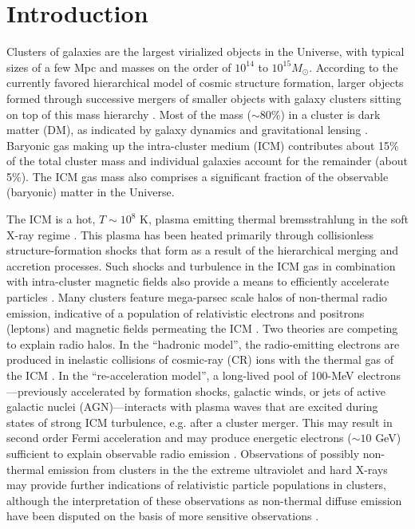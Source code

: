 \documentclass[12pt,manuscript]{aastex}
\begin{document}
%
%

\section{Introduction}
Clusters of galaxies are the largest virialized objects in the Universe, with typical sizes of a
few Mpc and masses on the order of $10^{14}$ to $10^{15} M_{\odot}$. According to the currently
favored hierarchical model of cosmic structure formation, larger objects formed through successive
mergers of smaller objects with galaxy clusters sitting on top of this mass hierarchy
\citep[see][for a review]{article:Voit:2005}. Most of the mass ($\sim$80\%) in a cluster is dark
matter (DM), as indicated by galaxy dynamics and gravitational lensing
\citep{article:DiaferioSchindlerDolag:2008}. Baryonic gas making up the intra-cluster medium (ICM)
contributes about 15\% of the total cluster mass and individual galaxies account for the remainder
(about 5\%). The ICM gas mass also comprises a significant fraction of the observable (baryonic)
matter in the Universe.

The ICM is a hot, $T\sim 10^{8}$ K, plasma emitting thermal bremsstrahlung in the soft X-ray regime
\citep[see, e.g.,][]{article:Petrosian:2001}. This plasma has been heated primarily through
collisionless structure-formation shocks that form as a result of the hierarchical merging and
accretion processes. Such shocks and turbulence in the ICM gas in combination with intra-cluster
magnetic fields also provide a means to efficiently accelerate particles \citep[see,
e.g.,][]{article:ColafrancescoBlasi:1998, article:Ryu_etal:2003}. Many clusters feature mega-parsec
scale halos of non-thermal radio emission, indicative of a population of relativistic electrons and
positrons (leptons) and magnetic fields permeating the ICM \citep{article:Cassano_etal:2010}. Two
theories are competing to explain radio halos. In the ``hadronic model'', the radio-emitting
electrons are produced in inelastic collisions of cosmic-ray (CR) ions with the thermal gas of the
ICM \citep{article:Dennison:1980, article:EnsslinPfrommerMiniatiSubramanian:2011}. In the
``re-acceleration model'', a long-lived pool of 100-MeV electrons---previously accelerated by
formation shocks, galactic winds, or jets of active galactic nuclei (AGN)---interacts with plasma
waves that are excited during states of strong ICM turbulence, e.g. after a cluster merger. This may
result in second order Fermi acceleration and may produce energetic electrons ($\sim 10$ GeV)
sufficient to explain observable radio emission \citep{article:SchlickeiserSieversThiemann:1987,
article:BrunettiLazarian:2010}. Observations of possibly non-thermal emission from clusters
in the the extreme ultraviolet \citep[EUV; ][]{article:SarazinLieu:1998} and hard X-rays
\citep{article:RephaeliGruber:2002, article:Fusco-Femiano_etal:2004, article:Eckert_etal:2007} may
provide further indications of relativistic particle populations in clusters, although the
interpretation of these observations as non-thermal diffuse emission have been disputed on the basis
of more sensitive observations \citep[see, e.g.,][]{article:Ajello_etal:2009,
article:Ajello_etal:2010, article:Wik_etal:2009}.
\end{document}
